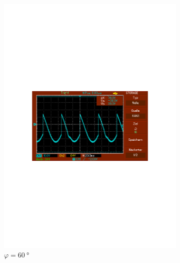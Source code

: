 \begin{figure}
\begin{subfigure}{0.3\textwidth}
      \includegraphics[width=\textwidth]{Daten/noNoise/60.pdf}
      \caption{$\varphi = \SI{60}{\degree}$}
      \label{fig:60}
  \end{subfigure}
  \par\medskip %
  \begin{subfigure}{0.3\textwidth}
      \centering

\end{subfigure}
\end{figure}
